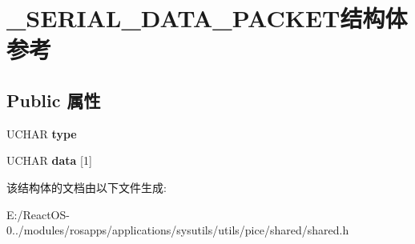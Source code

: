 \hypertarget{struct___s_e_r_i_a_l___d_a_t_a___p_a_c_k_e_t}{}\section{\+\_\+\+S\+E\+R\+I\+A\+L\+\_\+\+D\+A\+T\+A\+\_\+\+P\+A\+C\+K\+E\+T结构体 参考}
\label{struct___s_e_r_i_a_l___d_a_t_a___p_a_c_k_e_t}
\subsection*{Public 属性}
\begin{DoxyCompactItemize}
\item 
\mbox{\label{struct___s_e_r_i_a_l___d_a_t_a___p_a_c_k_e_t_a3b6f2d454f09b875b4e7f0989e9e2c9c}} 
U\+C\+H\+AR {\bfseries type}
\item 
\mbox{\label{struct___s_e_r_i_a_l___d_a_t_a___p_a_c_k_e_t_ae279350261b4bd4d2e6c9c93dcbd9f73}} 
U\+C\+H\+AR {\bfseries data} \mbox{[}1\mbox{]}
\end{DoxyCompactItemize}


该结构体的文档由以下文件生成\+:\begin{DoxyCompactItemize}
\item 
E\+:/\+React\+O\+S-\/0../modules/rosapps/applications/sysutils/utils/pice/shared/shared.\+h\end{DoxyCompactItemize}
